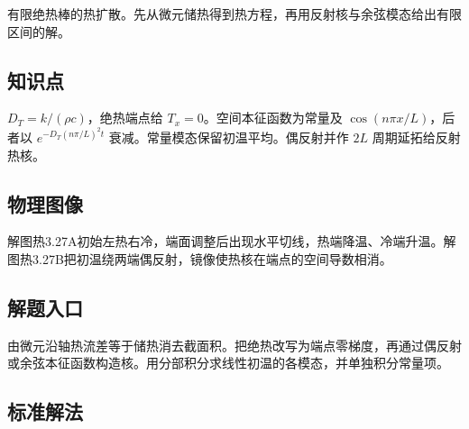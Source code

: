 \documentclass[UTF8,fontset=fandol,a4paper,11pt]{ctexart}
\begin{document}
有限绝热棒的热扩散。先从微元储热得到热方程，再用反射核与余弦模态给出有限区间的解。



\subsection*{知识点}

$D_T=k/(\rho c)$，绝热端点给 $T_x=0$。空间本征函数为常量及 $\cos(n\pi x/L)$，后者以 $e^{-D_T(n\pi/L)^2t}$ 衰减。常量模态保留初温平均。偶反射并作 $2L$ 周期延拓给反射热核。




\subsection*{物理图像}

解图热3.27A初始左热右冷，端面调整后出现水平切线，热端降温、冷端升温。解图热3.27B把初温绕两端偶反射，镜像使热核在端点的空间导数相消。



\subsection*{解题入口}

由微元沿轴热流差等于储热消去截面积。把绝热改写为端点零梯度，再通过偶反射或余弦本征函数构造核。用分部积分求线性初温的各模态，并单独积分常量项。




\subsection*{标准解法}
\end{document}
